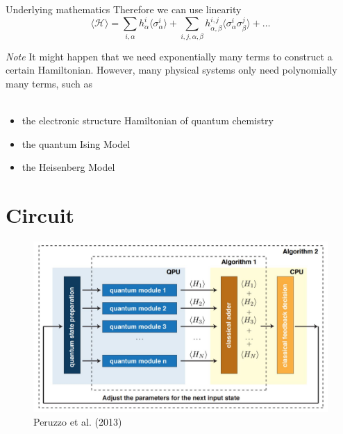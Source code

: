 \documentclass{beamer}
\renewcommand{\exp}[1]{\langle #1 \rangle} %
\begin{document}
\begin{frame}{Underlying mathematics}
Therefore we can use linearity 
\begin{equation}
\exp{\mathcal{H}} = \sum_{i, \alpha} h_\alpha^i\exp{\sigma_\alpha^i} + \sum_{i, j, \alpha, \beta} h_{\alpha,\beta}^{i,j}\exp{\sigma_\alpha^i\sigma_\beta^j} + \dots
\end{equation}
\end{frame}

\begin{frame}
	\emph{Note} It might happen that we need exponentially many terms to construct a certain Hamiltonian. However, many physical systems only need polynomially many terms, such as\\~\\
	\begin{itemize}
		\item the electronic structure Hamiltonian of quantum chemistry
		\item the quantum Ising Model
		\item the Heisenberg Model
	\end{itemize}
	
	 
\end{frame}

\section{Circuit}
\begin{frame}
\begin{figure}
	\includegraphics[scale=0.3]{figures/vqe_idea.jpg}
	\caption{Peruzzo et al. (2013)}
\end{figure}
\end{frame}
\end{document}
